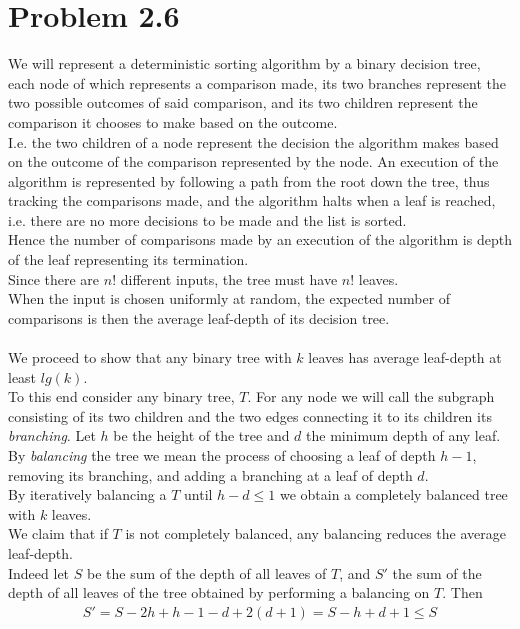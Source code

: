 \section*{Problem 2.6}
We will represent a deterministic sorting algorithm by a binary decision tree,
each node of which represents a comparison made,
its two branches represent the two possible outcomes of said comparison,
and its two children represent the comparison it chooses to make based on the outcome. \\
I.e. the two children of a node represent the decision the algorithm makes based on the outcome of the comparison represented by the node.
An execution of the algorithm is represented by following a path from the root down the tree,
thus tracking the comparisons made,
and the algorithm halts when a leaf is reached, 
i.e. there are no more decisions to be made and the list is sorted. \\
Hence the number of comparisons made by an execution of the algorithm is depth of the leaf representing its termination. \\
Since there are $n!$ different inputs, the tree must have $n!$ leaves. \\
When the input is chosen uniformly at random,
the expected number of comparisons is then the average leaf-depth of its decision tree. \\ \\
We proceed to show that any binary tree with $k$ leaves has average leaf-depth at least $lg(k)$. \\
To this end consider any binary tree, $T$. 
For any node we will call the subgraph consisting of its two children and the two edges connecting it to its children its \textit{branching}.
Let $h$ be the height of the tree and $d$ the minimum depth of any leaf. \\
By \textit{balancing} the tree we mean the process of choosing a leaf of depth $h-1$,
removing its branching,
and adding a branching at a leaf of depth $d$. \\
By iteratively balancing a $T$ until $h-d \leq 1$ we obtain a completely balanced tree with $k$ leaves. \\
We claim that if $T$ is not completely balanced, any balancing reduces the average leaf-depth. \\
Indeed let $S$ be the sum of the depth of all leaves of $T$,
and $S'$ the sum of the depth of all leaves of the tree obtained by performing a balancing on $T$. Then
\begin{align*}
	S'=S-2h+h-1-d+2(d+1)=S-h+d+1 \leq S
\end{align*}
